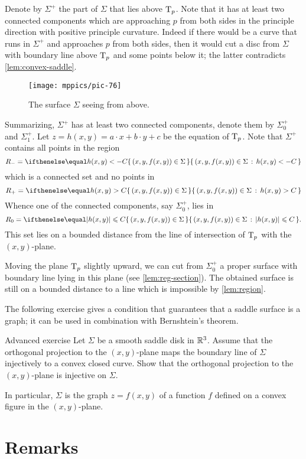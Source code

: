 Denote by $\Sigma^+$ the part of $\Sigma$ that lies above $\mathrm{T}_p$.
Note that it has at least two connected components which are approaching $p$ from both sides 
in the principle direction with positive principle curvature.
Indeed if there would be a curve that runs in $\Sigma^+$ and approaches $p$ from both sides, then it would cut a disc from $\Sigma$ with boundary line above $\mathrm{T}_p$ and some points below it;
the latter contradicts \ref{lem:convex-saddle}.

\begin{figure}[h!]
\vskip-0mm
\centering
\texttt{[image: mppics/pic-76]}
\caption*{The surface $\Sigma$ seeing from above.}
\vskip0mm
\end{figure}

Summarizing, $\Sigma^+$ has at least two connected components, denote them by $\Sigma^+_0$ and $\Sigma^+_1$.
Let $z=h(x,y)=a\cdot x+b\cdot y+c$ be the equation of $\mathrm{T}_p$.
Note that $\Sigma^+$ contains all points in the region
\[R_-=\set{(x,y,f(x,y))\in\Sigma}{h(x,y)< -C}\] 
which is a connected set and no points in 
\[R_+=\set{(x,y,f(x,y))\in\Sigma}{h(x,y)> C}\]
Whence one of the connected components, say $\Sigma^+_0$, lies in 
\[R_0=\set{(x,y,f(x,y))\in\Sigma}{|h(x,y)|\le  C}.\]
This set lies on a bounded distance from the line of intersection of $\mathrm{T}_p$ with the $(x,y)$-plane.

Moving the plane $\mathrm{T}_p$ slightly upward, we can cut from $\Sigma^+_0$ a proper surface with boundary line lying in this plane (see \ref{lem:reg-section}).
The obtained surface is still on a bounded distance to a line
which is impossible by \ref{lem:region}.
\qeds

The following exercise gives a condition that guarantees that a saddle surface is a graph;
it can be used in combination with Bernshtein's theorem.

\begin{thm}{Advanced exercise}\label{ex:saddle-graph}
Let $\Sigma$ be a smooth saddle disk in $\mathbb{R}^3$.
Assume that the orthogonal projection to the $(x,y)$-plane
maps the boundary line of $\Sigma$
injectively to a convex closed curve.
Show that the orthogonal projection to the $(x,y)$-plane is injective on $\Sigma$.

In particular, $\Sigma$ is the graph $z=f(x,y)$ of a function $f$ defined on a convex figure in the $(x,y)$-plane.
\end{thm}


\section*{Remarks}

